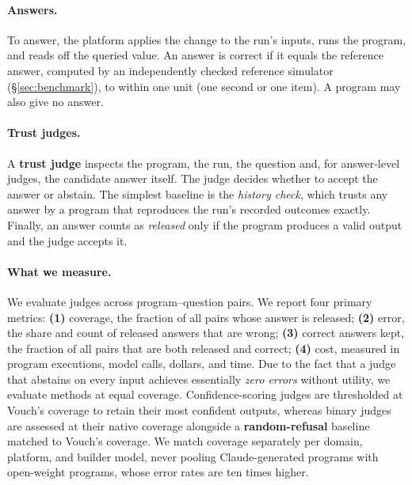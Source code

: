 \paragraph{Answers.} To answer, the platform applies the change to the run's inputs, runs the program, and reads off the queried value. An answer is correct if it equals the reference answer, computed by an independently checked reference simulator (\S\ref{sec:benchmark}), to within one unit (one second or one item). A program may also give no answer.

\paragraph{Trust judges.} A \textbf{trust judge} inspects the program, the run, the question and, for answer-level judges, the candidate answer itself. The judge decides whether to accept the answer or abstain. The simplest baseline is the \emph{history check}, which trusts any answer by a program that reproduces the run's recorded outcomes exactly. Finally, an answer counts as \emph{released} only if the program produces a valid output and the judge accepts it.

\paragraph{What we measure.} We evaluate judges across program--question pairs. We report four primary metrics: \textbf{(1)} coverage, the fraction of all pairs whose answer is released; \textbf{(2)} error, the share and count of released answers that are wrong; \textbf{(3)} correct answers kept, the fraction of all pairs that are both released and correct; \textbf{(4)} cost, measured in program executions, model calls, dollars, and time. Due to the fact that a judge that abstains on every input achieves essentially \emph{zero errors} without utility, we evaluate methods at equal coverage. Confidence-scoring judges are thresholded at Vouch's coverage to retain their most confident outputs, whereas binary judges are assessed at their native coverage alongside a \textbf{random-refusal} baseline matched to Vouch's coverage. We match coverage separately per domain, platform, and builder model, never pooling Claude-generated programs with open-weight programs, whose error rates are ten times higher.
